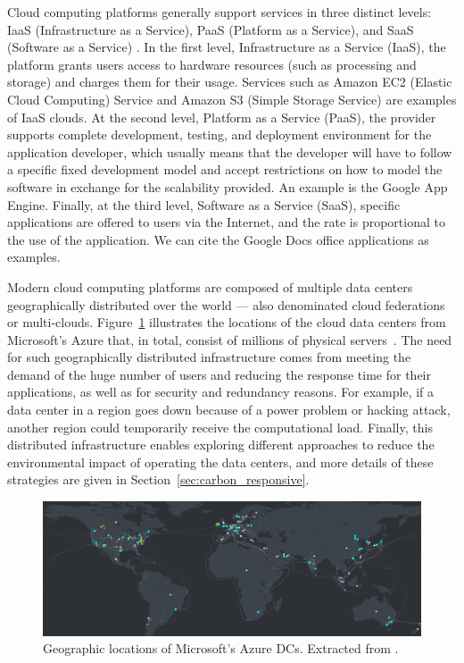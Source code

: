 Cloud computing platforms generally support services in three distinct levels: IaaS (Infrastructure as a Service), PaaS (Platform as a Service), and SaaS (Software as a Service) \citep{fos08}. In the first level, Infrastructure as a Service (IaaS), the platform grants users access to hardware resources (such as processing and storage) and charges them for their usage. Services such as Amazon EC2 (Elastic Cloud Computing) Service and Amazon S3 (Simple Storage Service) are examples of IaaS clouds.   At the second level, Platform as a Service (PaaS), the provider supports complete development, testing, and deployment environment for the application developer, which usually means that the developer will have to follow a specific fixed development model and accept restrictions on how to model the software in exchange for the scalability provided. An example is the Google App Engine. Finally, at the third level, Software as a Service (SaaS), specific applications are offered to users via the Internet, and the rate is proportional to the use of the application. We can cite the  Google Docs office applications as examples.

Modern cloud computing platforms are composed of multiple data centers geographically distributed over the world --- also denominated cloud federations or multi-clouds. Figure~\ref{fig:dc_locations} illustrates the locations of the cloud data centers from Microsoft's Azure that, in total, consist of millions of physical servers~\cite{roach2021_microsoftazure}. The need for such geographically distributed infrastructure comes from meeting the demand of the huge number of users and reducing the response time for their applications, as well as for security and redundancy reasons. For example, if a data center in a region goes down because of a power problem or hacking attack, another region could temporarily receive the computational load. Finally, this distributed infrastructure enables exploring different approaches to reduce the environmental impact of operating the data centers, and more details of these strategies are given in Section~\ref{sec:carbon_responsive}.


\begin{figure}[h]
\centering
  \includegraphics[width=\linewidth]{images/azure_cloud_infra.png}
  \caption{Geographic locations of Microsoft's Azure DCs. Extracted from \cite{azure_dcs_location}.}
  \label{fig:dc_locations}
\end{figure}


